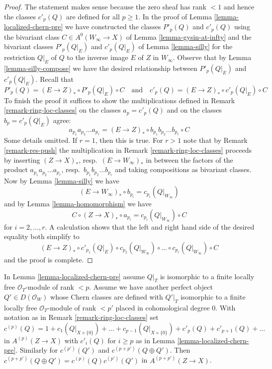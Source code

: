 \begin{proof}
The statement makes sense because the zero sheaf has rank $< 1$ and
hence the classes $c'_p(Q)$ are defined for all $p \geq 1$.
In the proof of Lemma \ref{lemma-localized-chern-pre} we have constructed
the classes $P'_p(Q)$ and $c'_p(Q)$ using the bivariant class
$C \in A^0(W_\infty \to X)$ of Lemma \ref{lemma-gysin-at-infty}
and the bivariant classes
$P'_p(Q|_E)$ and $c'_p(Q|_E)$ of Lemma \ref{lemma-silly} for the restriction
$Q|_E$ of $Q$ to the inverse image $E$ of $Z$ in $W_\infty$.
Observe that by Lemma \ref{lemma-silly-compose} we have the desired
relationship between $P'_p(Q|_E)$ and $c'_p(Q|_E)$. Recall that
$$
P'_p(Q) = (E \to Z)_* \circ P'_p(Q|_E) \circ C
\quad\text{and}\quad
c'_p(Q) = (E \to Z)_* \circ c'_p(Q|_E) \circ C
$$
To finish the proof it suffices to show the multiplications defined
in Remark \ref{remark-ring-loc-classes} on the classes $a_p = c'_p(Q)$
and on the classes $b_p = c'_p(Q|_E)$ agree:
$$
a_{p_1}a_{p_2} \ldots a_{p_r} =
(E \to Z)_* \circ b_{p_1}b_{p_2} \ldots b_{p_r} \circ C
$$
Some details omitted. If $r = 1$, then this is true.
For $r > 1$ note that by Remark \ref{remark-res-push} the multiplication in
Remark \ref{remark-ring-loc-classes} proceeds
by inserting $(Z \to X)_*$, resp.\ $(E \to W_\infty)_*$ in between
the factors of the product
$a_{p_1}a_{p_2} \ldots a_{p_r}$, resp.\ $b_{p_1}b_{p_2} \ldots b_{p_r}$
and taking compositions as bivariant classes.
Now by Lemma \ref{lemma-silly} we have
$$
(E \to W_\infty)_* \circ b_{p_i} = c_{p_i}(Q|_{W_\infty})
$$
and by Lemma \ref{lemma-homomorphism} we have
$$
C \circ (Z \to X)_* \circ a_{p_i} = c_{p_i}(Q|_{W_\infty}) \circ C
$$
for $i = 2, \ldots, r$. A calculation
shows that the left and right hand side of the desired
equality both simplify to
$$
(E \to Z)_* \circ c'_{p_1}(Q|_E) \circ
c_{p_2}(Q|_{W_\infty}) \circ \ldots \circ
c_{p_r}(Q|_{W_\infty}) \circ C
$$
and the proof is complete.
\end{proof}

\begin{lemma}
\label{lemma-localized-chern-pre-sum-c}
In Lemma \ref{lemma-localized-chern-pre} assume $Q|_T$ is isomorphic
to a finite locally free $\mathcal{O}_T$-module of rank $< p$.
Assume we have another perfect object $Q' \in D(\mathcal{O}_W)$
whose Chern classes are defined with $Q'|_T$ isomorphic to a
finite locally free $\mathcal{O}_T$-module of rank $< p'$ placed
in cohomological degree $0$. With notation as in
Remark \ref{remark-ring-loc-classes} set
$$
c^{(p)}(Q) = 1 + c_1(Q|_{X \times \{0\}}) + \ldots +
c_{p - 1}(Q|_{X \times \{0\}}) +
c'_{p}(Q) + c'_{p + 1}(Q) + \ldots
$$
in $A^{(p)}(Z \to X)$ with $c'_i(Q)$ for $i \geq p$ as in
Lemma \ref{lemma-localized-chern-pre}. Similarly for $c^{(p')}(Q')$ and
$c^{(p + p')}(Q \oplus Q')$.
Then $c^{(p + p')}(Q \oplus Q') = c^{(p)}(Q)c^{(p')}(Q')$
in $A^{(p + p')}(Z \to X)$.
\end{lemma}

